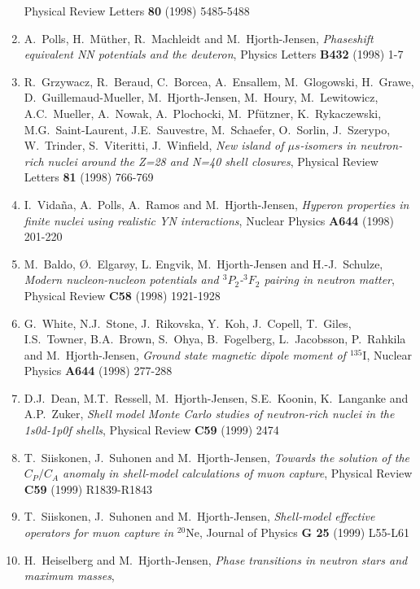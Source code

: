 \begin{enumerate}
    Physical Review Letters {\bf 80} (1998) 5485-5488
\item    
    A.\ Polls, H.\ M\"uther, R.\ Machleidt and
    M.\ Hjorth-Jensen, 
    {\em Phaseshift equivalent NN potentials and the deuteron},
    Physics Letters {\bf B432} (1998) 1-7
\item 
    R.\ Grzywacz, R.\ Beraud, C.\ Borcea, A.\ Ensallem, M.\ Glogowski,  H.\ Grawe, D.\ Guillemaud-Mueller, M.\ Hjorth-Jensen, M.\ Houry,
  M.\ Lewitowicz, A.C.\ Mueller, A.\ Nowak, A.\ Plochocki, 
  M.\ Pf\"utzner, K.\ Rykaczewski, M.G.\ Saint-Laurent, J.E.\ Sauvestre, M.\ Schaefer, O.\ Sorlin, J.\ Szerypo, W.\ Trinder, S.\ Viteritti, J.\ Winfield,
  {\em New island of $\mu s$-isomers in neutron-rich nuclei around the
  Z=28 and N=40 shell closures}, 
  Physical Review Letters {\bf 81} (1998) 766-769 
\item I.\ Vida\~na, A.\ Polls, A.\ Ramos and  
       M.\ Hjorth-Jensen,
    {\em Hyperon properties in finite nuclei using realistic YN interactions},
    Nuclear Physics {\bf A644} (1998) 201-220
\item
    M.\ Baldo, \O.\ Elgar\o y, L. Engvik,
    M.\ Hjorth-Jensen and H.-J.\ Schulze,
    {\em Modern nucleon-nucleon potentials and $^3P_2$-$^3F_2$ pairing 
      in neutron matter},
    Physical Review  {\bf C58} (1998)  1921-1928 
\item 
    G.\ White, N.J.\ Stone, J.\ Rikovska, Y.\ Koh, J.\ Copell,
    T.\ Giles, I.S.\ Towner, B.A.\ Brown, S.\ Ohya, B.\ Fogelberg,
    L.\ Jacobsson, P.\ Rahkila and M.\ Hjorth-Jensen,
    {\em Ground state magnetic dipole moment of $^{135}$}I,
    Nuclear Physics {\bf A644} (1998) 277-288
\item D.J.\ Dean, M.T.\ Ressell, M.\ Hjorth-Jensen, S.E.\ Koonin, K.\ Langanke
      and A.P.\ Zuker, {\em Shell model Monte Carlo studies of neutron-rich
      nuclei in the 1s0d-1p0f shells}, Physical Review {\bf C59} (1999) 2474 
\item T.\ Siiskonen, J.\ Suhonen and M.\ Hjorth-Jensen, {\em  
      Towards the solution of the $C_{P}/C_{A}$ anomaly in shell-model 
      calculations of muon capture}, Physical Review {\bf C59} (1999) 
      R1839-R1843
\item T.\ Siiskonen, J.\ Suhonen and M.\ Hjorth-Jensen, {\em  
      Shell-model effective operators for muon capture in} $^{20}$Ne,
      Journal of Physics {\bf G 25} (1999) L55-L61
\item 
        H.\ Heiselberg and M.\ Hjorth-Jensen,
    {\em Phase transitions in neutron stars and maximum masses}, 

\end{enumerate}
